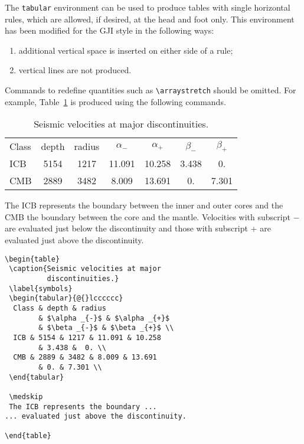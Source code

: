 \documentclass{gji}
\begin{document}
The \verb"tabular" environment can be used to produce tables with
single horizontal rules, which are allowed, if desired, at the head and
foot only. This environment has been modified for the GJI style in the
following ways:
\begin{enumerate}
  \item additional vertical space is inserted on either side of a rule;
  \item vertical lines are not produced.
\end{enumerate}
Commands to redefine quantities such as \verb"\arraystretch" should be
omitted. For example, Table~\ref{symbols} is produced using the
following commands.
\begin{table}
 \caption{Seismic velocities at major discontinuities.}
 \label{symbols}
 \begin{tabular}{@{}lcccccc}
  Class & depth & radius
        & $\alpha _{-}$ & $\alpha _{+}$
        & $\beta _{-}$ & $\beta _{+}$ \\
  ICB & 5154 & 1217 & 11.091 & 10.258
        & 3.438 &  0. \\
  CMB & 2889 & 3482 & 8.009 & 13.691
        & 0. & 7.301 \\
 \end{tabular}

 \medskip
 The ICB represents the boundary between the inner and outer cores and
the CMB the boundary between the core and the mantle.  Velocities with
subscript $-$ are evaluated just below the discontinuity and
those with subscript $+$ are evaluated just above the discontinuity.
\end{table}
\begin{verbatim}
\begin{table}
 \caption{Seismic velocities at major
          discontinuities.}
 \label{symbols}
 \begin{tabular}{@{}lcccccc}
  Class & depth & radius
        & $\alpha _{-}$ & $\alpha _{+}$
        & $\beta _{-}$ & $\beta _{+}$ \\
  ICB & 5154 & 1217 & 11.091 & 10.258
        & 3.438 &  0. \\
  CMB & 2889 & 3482 & 8.009 & 13.691
        & 0. & 7.301 \\
 \end{tabular}

 \medskip
 The ICB represents the boundary ...
... evaluated just above the discontinuity.

\end{table}
\end{verbatim}
\end{document}
